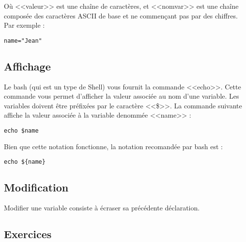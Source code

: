 \documentclass[11pt]{article}
\begin{document}
Où <<valeur>> est une chaîne de caractères, et <<nomvar>> est une chaîne composée des caractères ASCII de base et ne commençant pas par des chiffres. Par exemple :

\begin{lstlisting}
name="Jean"
\end{lstlisting}

\subsection{Affichage}

Le bash (qui est un type de Shell) vous fournit la commande <<echo>>. Cette commande vous permet d’afficher la valeur associée au nom d’une variable. Les variables doivent être préfixées
par le caractère <<\$>>. La commande suivante affiche la valeur associée à la variable denommée <<name>> :

\begin{lstlisting}
echo $name
\end{lstlisting}

Bien que cette notation fonctionne, la notation recomandée par bash est :

\begin{lstlisting}
echo ${name}
\end{lstlisting}

\subsection{Modification}

Modifier une variable consiste à écraser sa précédente déclaration.

\subsection{Exercices}
\end{document}
